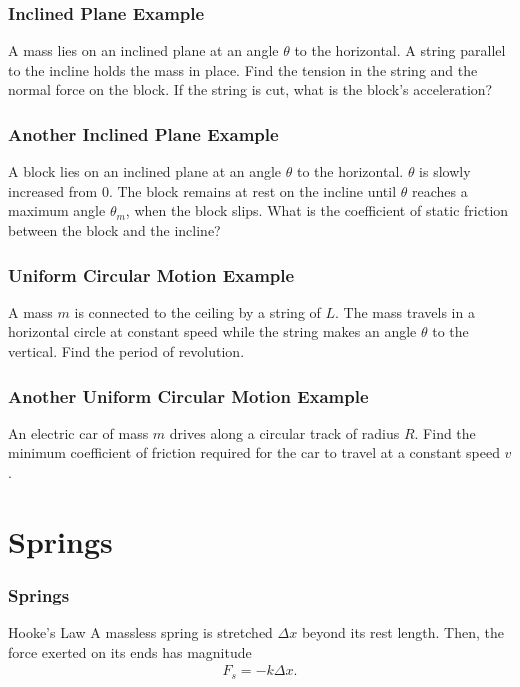 \documentclass[20pt]{beamer}
\begin{document}
\begin{frame}
	\frametitle{Inclined Plane Example}
	\begin{example}
		A mass lies on an inclined plane at an angle $\theta$ to the horizontal. A string parallel to the incline holds the mass in place. Find the tension in the string and the normal force on the block. If the string is cut, what is the block's acceleration?
	\end{example}
\end{frame}

\begin{frame}
	\frametitle{Another Inclined Plane Example}
	\begin{example}
		A block lies on an inclined plane at an angle $\theta$ to the horizontal. $\theta$ is slowly increased from $0$. The block remains at rest on the incline until $\theta$ reaches a maximum angle $\theta_m$, when the block slips. What is the coefficient of static friction between the block and the incline?
	\end{example}
\end{frame}

\begin{frame}
	\frametitle{Uniform Circular Motion Example}
	\begin{example}
		A mass $m$ is connected to the ceiling by a string of $L$. The mass travels in a horizontal circle at constant speed while the string makes an angle $\theta$ to the vertical. Find the period of revolution.
		\begin{figure}[ht]
			\centering
			\label{fig:conicalpendulum}
		\end{figure}
	\end{example}
\end{frame}

\begin{frame}
	\frametitle{Another Uniform Circular Motion Example}
	\begin{example}
		An electric car of mass $m$ drives along a circular track of radius $R$. Find the minimum coefficient of friction required for the car to travel at a constant speed $v$.
	\end{example}
\end{frame}

\section{Springs}

\begin{frame}
	\frametitle{Springs}
	\begin{theorem}{Hooke's Law}
		A massless spring is stretched $\Delta x$ beyond its rest length. Then, the force exerted on its ends has magnitude
		\begin{align*}
			F_s = -k \Delta x.
		\end{align*}
	\end{theorem}
\end{frame}
\end{document}
